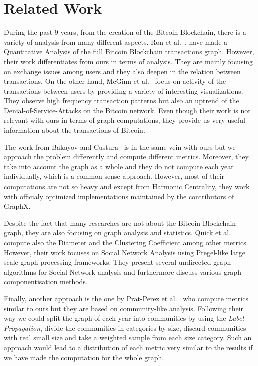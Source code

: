 \section{Related Work}
\label{sec:related}
During the past 9 years, from the creation of the Bitcoin Blockchain, there is a variety of analysis from many different aspects. Ron et al.~\cite{Ron}, have made a Quantitative Analysis of the full Bitcoin Blockchain transactions graph. However, their work differentiates from ours in terms of analysis. They are mainly focusing on exchange issues among users and they also deepen in the relation between transactions. On the other hand, McGinn et al.~\cite{McGinn} focus on activity of the transactions between users by providing a variety of interesting visualizations. They observe high frequency transaction patterns but also an uptrend of the Denial-of-Service-Attacks on the Bitcoin network. Even though their work is not relevant with ours in terms of graph-computations, they provide us very useful information about the transactions of Bitcoin.

The work from Bakayov and Custura~\cite{Bakayof} is in the same vein with ours but we approach the problem differently and compute different metrics. Moreover, they take into account the graph as a whole and they do not compute each year individually, which is a common-sense approach. However, most of their computations are not so heavy and except from Harmonic Centrality, they work with officialy optimized implementations maintained by the contributors of GraphX. 

Despite the fact that many researches are not about the Bitcoin Blockchain graph, they are also focusing on graph analysis and statistics. Quick et al.~\cite{Quick} compute also the Diameter and the Clustering Coefficient among other metrics. However, their work focuses on Social Network Analysis using Pregel-like large scale graph processing frameworks. They present several undirected graph algorithms for Social Network analysis and furthermore discuss various graph componentisation methods.

Finally, another approach is the one by Prat-Perez et al.~\cite{PratPerez} who compute metrics similar to ours but they are based on community-like analysis. Following their way we could split the graph of each year into communities by using the \textit{Label Propagation}, divide the communities in categories by size, discard communities with real small size and take a weighted sample from each size category. Such an approach would lead to a distribution of each metric very similar to the results if we have made the computation for the whole graph.
